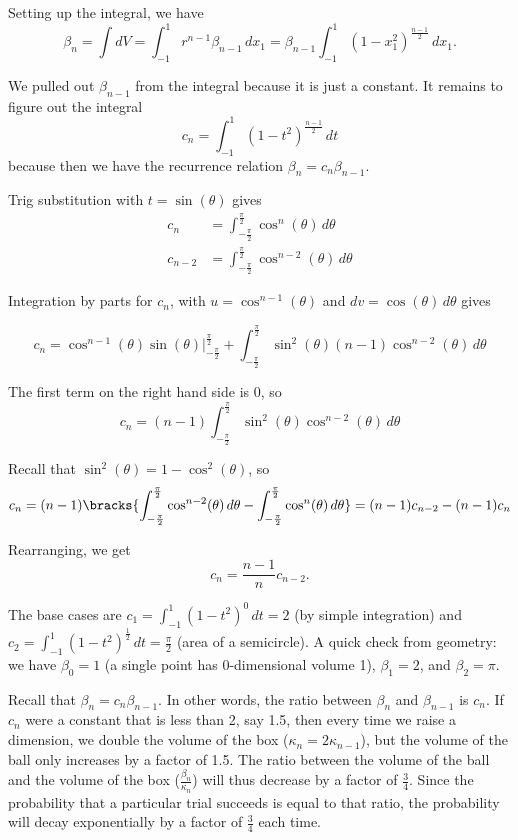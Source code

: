 \documentclass{article}
\begin{document}
Setting up the integral, we have
\[
    \beta_n = \int dV = \int_{-1}^1 r^{n-1} \beta_{n-1} \, dx_1 = \beta_{n-1} \int_{-1}^1 (1 - x_1^2)^{\frac{n-1}{2}} \, dx_1.
\]

We pulled out $\beta_{n-1}$ from the integral because it is just a constant. It remains to figure out the integral
\[
    c_n = \int_{-1}^1 (1 - t^2)^{\frac{n-1}{2}} \, dt
\]
because then we have the recurrence relation $\beta_n = c_n \beta_{n - 1}$.

Trig substitution with $t = \sin(\theta)$ gives
\begin{align*}
    c_n     & = \int_{-\frac{\pi}{2}}^{\frac{\pi}{2}} \cos^{n}(\theta) \, d\theta   \\
    c_{n-2} & = \int_{-\frac{\pi}{2}}^{\frac{\pi}{2}} \cos^{n-2}(\theta) \, d\theta
\end{align*}

Integration by parts for $c_n$, with $u = \cos^{n-1}(\theta)$ and $dv = \cos(\theta) \, d\theta$ gives

\[
    c_n = \cos^{n-1}(\theta) \sin(\theta) \bigg|_{-\frac{\pi}{2}}^{\frac{\pi}{2}} + \int_{-\frac{\pi}{2}}^{\frac{\pi}{2}} \sin^2(\theta) (n-1) \cos^{n-2}(\theta) \, d\theta
\]

The first term on the right hand side is 0, so
\[
    c_n = (n-1) \int_{-\frac{\pi}{2}}^{\frac{\pi}{2}} \sin^2(\theta) \cos^{n-2}(\theta) \, d\theta
\]

Recall that $\sin^2(\theta) = 1 - \cos^2(\theta)$, so
\[
    c_n = (n-1) \bracks{\int_{-\frac{\pi}{2}}^{\frac{\pi}{2}} \cos^{n-2}(\theta) \, d\theta - \int_{-\frac{\pi}{2}}^{\frac{\pi}{2}} \cos^n(\theta) \, d\theta} = (n-1) c_{n-2} - (n-1) c_n
\]

Rearranging, we get
\[
    c_n = \frac{n-1}{n}c_{n-2}.
\]

The base cases are $c_1 = \int_{-1}^1 (1 - t^2)^0 \, dt = 2$ (by simple integration) and $c_2 = \int_{-1}^1 (1 - t^2)^{\frac{1}{2}} \, dt = \frac{\pi}{2}$ (area of a semicircle). A quick check from geometry: we have $\beta_0 = 1$ (a single point has 0-dimensional volume 1), $\beta_1 = 2$, and $\beta_2 = \pi$.


Recall that $\beta_n = c_n \beta_{n - 1}$. In other words, the ratio between $\beta_n$ and $\beta_{n - 1}$ is $c_n$. If $c_n$ were a constant that is less than 2, say 1.5, then every time we raise a dimension, we double the volume of the box ($\kappa_{n} = 2 \kappa_{n - 1}$), but the volume of the ball only increases by a factor of 1.5. The ratio between the volume of the ball and the volume of the box ($\frac{\beta_n}{\kappa_n}$) will thus decrease by a factor of $\frac{3}{4}$. Since the probability that a particular trial succeeds is equal to that ratio, the probability will decay exponentially by a factor of $\frac{3}{4}$ each time.
\end{document}
